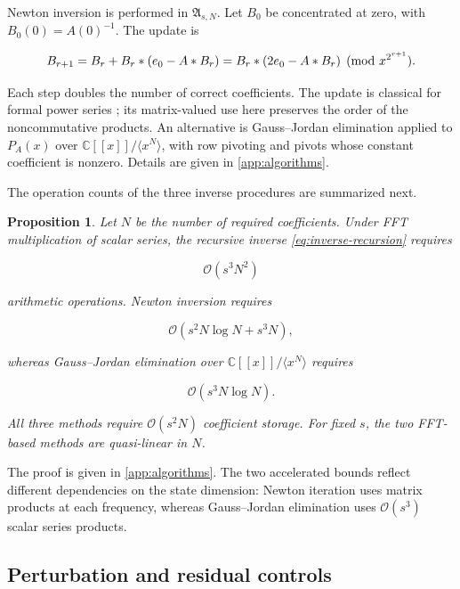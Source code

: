 \documentclass[3p,12pt,authoryear]{elsarticle}
\newtheorem{proposition}[theorem]{Proposition}
\theoremstyle{definition}
\theoremstyle{remark}
\newcommand{\C}{\mathbb C}
\newcommand{\ez}{e_{\mathstrut 0}}
\begin{document}
Newton inversion is performed in $\mathfrak A_{s,N}$. Let $B_0$ be concentrated at zero, with
$B_0(0)=A(0)^{-1}$. The update is

\begin{equation}\label{eq:newton}
B_{r+1}
=
B_r+B_r*(\ez-A*B_r)
=
B_r*(2\ez-A*B_r)
\pmod{x^{2^{r+1}}}.
\end{equation}

Each step doubles the number of correct coefficients. The update is classical for formal power series \citep{BrentKung1978}; its matrix-valued use here preserves the order of the noncommutative products. An alternative is Gauss--Jordan elimination applied to $P_A(x)$ over $\C[[x]]/\langle x^N\rangle$, with row pivoting and pivots whose constant coefficient is nonzero. Details are given in \ref{app:algorithms}.


The operation counts of the three inverse procedures are summarized next.

\begin{proposition}\label{prop:inverse-complexity}
Let $N$ be the number of required coefficients. Under FFT multiplication of scalar series, the recursive inverse \eqref{eq:inverse-recursion} requires

\begin{equation*}
\mathcal O(s^3N^2)
\end{equation*}

arithmetic operations. Newton inversion requires

\begin{equation*}
\mathcal O(s^2N\log N+s^3N),
\end{equation*}

whereas Gauss--Jordan elimination over $\C[[x]]/\langle x^N\rangle$ requires

\begin{equation*}
\mathcal O(s^3N\log N).
\end{equation*}

All three methods require $\mathcal O(s^2N)$ coefficient storage. For fixed $s$, the two FFT-based methods are quasi-linear in $N$.
\end{proposition}

The proof is given in \ref{app:algorithms}. The two accelerated bounds reflect different dependencies on the state dimension: Newton iteration uses matrix products at each frequency, whereas Gauss--Jordan elimination uses $\mathcal O(s^3)$ scalar series products.

\subsection{Perturbation and residual controls}
\end{document}
